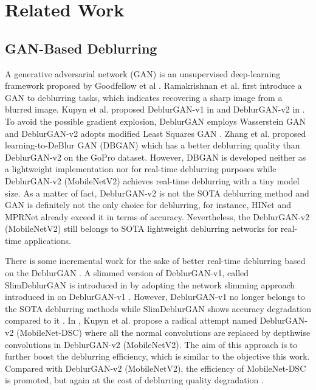 \documentclass[letterpaper, 10 pt, conference]{ieeeconf}
\begin{document}
\section{Related Work\label{relate}}


\subsection{GAN-Based Deblurring}
A generative adversarial network (GAN) is an unsupervised deep-learning framework proposed by Goodfellow et al  \cite{gan}. Ramakrishnan et al. \cite{deep} first introduce a GAN to deblurring tasks, which indicates recovering a sharp image from a blurred image. Kupyn et al. proposed DeblurGAN-v1 in \cite{deblurgan1} and DeblurGAN-v2 in \cite{deblurgan2}. To avoid the possible gradient explosion, DeblurGAN employs Wasserstein GAN \cite{wgan} and DeblurGAN-v2 adopts modified Least Squares GAN  \cite{lsgan}. Zhang et al. \cite{dbgan} proposed learning-to-DeBlur GAN (DBGAN) \cite{dbgan} which has a better deblurring quality than DeblurGAN-v2 on the GoPro dataset. However, DBGAN \cite{dbgan} is developed neither as a lightweight implementation nor for real-time deblurring purposes while DeblurGAN-v2 (MobileNetV2) \cite{deblurgan2} achieves real-time deblurring with a tiny model size. As a matter of fact, DeblurGAN-v2 is not the SOTA deblurring method and GAN is definitely not the only choice for deblurring, for instance, HINet \cite{chen2021hinet} and MPRNet \cite{zamir} already exceed it in terms of accuracy. Nevertheless, the DeblurGAN-v2 (MobileNetV2) still belongs to SOTA lightweight deblurring networks for real-time applications.

There is some incremental work \cite{truong2020slimdeblurgan,deblurgan2} for the sake of better real-time deblurring based on the DeblurGAN \cite{deblurgan1,deblurgan2}. A slimmed version of DeblurGAN-v1, called SlimDeblurGAN is introduced in \cite{truong2020slimdeblurgan} by adopting the network slimming approach introduced in \cite{liuslim} on DeblurGAN-v1 \cite{deblurgan1}. However, DeblurGAN-v1 no longer belongs to the SOTA deblurring methods while SlimDeblurGAN shows accuracy degradation compared to it \cite{truong2020slimdeblurgan}. In \cite{deblurgan2}, Kupyn et al. propose a radical attempt named  DeblurGAN-v2 (MobileNet-DSC) where all the normal convolutions are replaced by depthwise convolutions \cite{dw} in DeblurGAN-v2 (MobileNetV2). The aim of this approach is to further boost the deblurring efficiency, which is similar to the objective this work. Compared with DeblurGAN-v2 (MobileNetV2), the efficiency of MobileNet-DSC is promoted, but again at the cost of deblurring quality degradation \cite{deblurgan2}.
\end{document}
